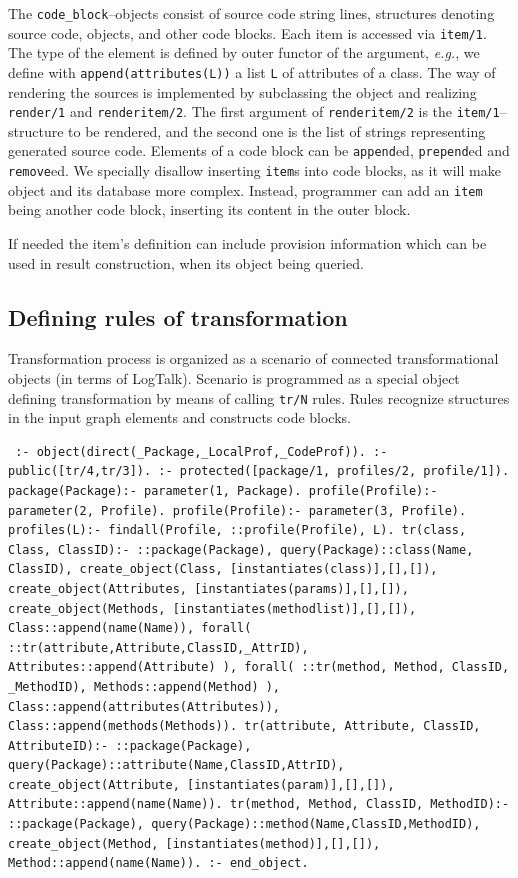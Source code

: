 \documentclass[conference]{IEEEtran} \IEEEoverridecommandlockouts
\begin{document}
The \verb|code_block|--objects consist of source code string lines, structures denoting source code, objects, and other code blocks. Each item is accessed via \verb|item/1|. The type of the element is defined by outer functor of the argument, \emph{e.g.}, we define with \verb|append(attributes(L))| a list \verb|L| of attributes of a class. The way of rendering the sources is implemented by subclassing the object and realizing \verb|render/1| and \verb|renderitem/2|. The first argument of \verb|renderitem/2| is the \verb|item/1|--structure to be rendered, and the second one is the list of strings representing generated source code. Elements of a code block can be \verb|append|ed, \verb|prepend|ed and \verb|remove|ed. We specially disallow inserting \verb|item|s into code blocks, as it will make object and its database more complex. Instead, programmer can add an \verb|item| being another code block, inserting its content in the outer block. 

If needed the item's definition can include provision information which can be used in result construction, when its object being queried. 

\subsection{Defining rules of transformation} \label{sec:mda-rules} 

Transformation process is organized as a scenario of connected transformational objects (in terms of LogTalk). Scenario is programmed as a special object defining transformation by means of calling \verb|tr/N| rules. Rules recognize structures in the input graph elements and constructs code blocks. 

\begin{verbatim} :- object(direct(_Package,_LocalProf,_CodeProf)). :- public([tr/4,tr/3]). :- protected([package/1, profiles/2, profile/1]). package(Package):- parameter(1, Package). profile(Profile):- parameter(2, Profile). profile(Profile):- parameter(3, Profile). profiles(L):- findall(Profile, ::profile(Profile), L). tr(class, Class, ClassID):- ::package(Package), query(Package)::class(Name, ClassID), create_object(Class, [instantiates(class)],[],[]), create_object(Attributes, [instantiates(params)],[],[]), create_object(Methods, [instantiates(methodlist)],[],[]), Class::append(name(Name)), forall( ::tr(attribute,Attribute,ClassID,_AttrID), Attributes::append(Attribute) ), forall( ::tr(method, Method, ClassID, _MethodID), Methods::append(Method) ), Class::append(attributes(Attributes)), Class::append(methods(Methods)). tr(attribute, Attribute, ClassID, AttributeID):- ::package(Package), query(Package)::attribute(Name,ClassID,AttrID), create_object(Attribute, [instantiates(param)],[],[]), Attribute::append(name(Name)). tr(method, Method, ClassID, MethodID):- ::package(Package), query(Package)::method(Name,ClassID,MethodID), create_object(Method, [instantiates(method)],[],[]), Method::append(name(Name)). :- end_object. \end{verbatim} 
\end{document}
